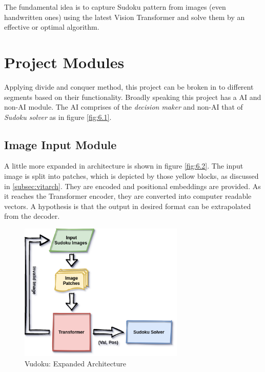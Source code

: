\documentclass[12pt, a4paper]{report}
\begin{document}
The fundamental idea is to capture Sudoku pattern from images (even handwritten ones) using the latest Vision Transformer and solve them by an effective or optimal algorithm.

\section{Project Modules}
\label{sec:prjtmod}

\hspace{0.5cm} Applying divide and conquer method, this project can be broken in to different segments based on their functionality. Broadly speaking this project has a AI and non-AI module. The AI comprises of the \emph{decision maker} and non-AI that of \emph{Sudoku solver} as in figure \eqref{fig:6.1}.

\subsection{Image Input Module}
\label{subsec:ipvit}

\hspace{0.5cm} A little more expanded in architecture is shown in figure \eqref{fig:6.2}. The input image is split into patches, which is depicted by those yellow blocks, as discussed in \eqref{subsec:vitarch}. They are encoded and positional embeddings are provided. As it reaches the Transformer encoder, they are converted into computer readable vectors. A hypothesis is that the output in desired format can be extrapolated from the decoder.

\begin{figure}[!htbp]
    \centering
    \includegraphics[width=0.7\textwidth]{vudoku_arch02.png}
    \caption[Vudoku: Expanded Architecture]{Vudoku: Expanded Architecture}
    \label{fig:6.2}
\end{figure}
\end{document}
